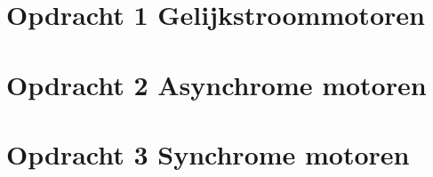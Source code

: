 \documentclass{article}
\begin{document}
\section*{Opdracht 1 Gelijkstroommotoren}


\newpage
\section*{Opdracht 2 Asynchrome motoren}


\newpage
\section*{Opdracht 3 Synchrome motoren}

\end{document}
